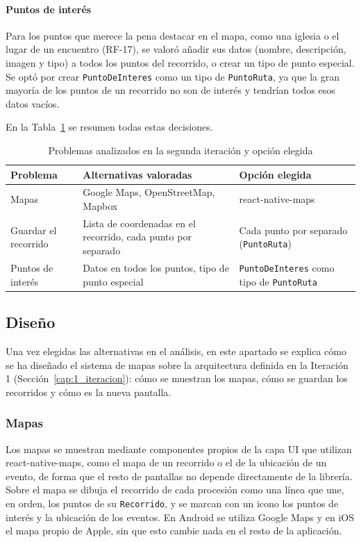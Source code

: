 \paragraph{Puntos de interés}
Para los puntos que merece la pena destacar en el mapa, como una iglesia o el lugar de un encuentro (RF-17), se valoró añadir sus datos (nombre, descripción, imagen y tipo) a todos los puntos del recorrido, o crear un tipo de punto especial. Se optó por crear \texttt{PuntoDeInteres} como un tipo de \texttt{PuntoRuta}, ya que la gran mayoría de los puntos de un recorrido no son de interés y tendrían todos esos datos vacíos.

En la Tabla~\ref{tab:alternativasIt2} se resumen todas estas decisiones.

\begin{table}[H]
\centering
\small
\begin{tabular}{|p{3.6cm}|p{5.6cm}|p{4.4cm}|}
\hline
\textbf{Problema} & \textbf{Alternativas valoradas} & \textbf{Opción elegida} \\
\hline
Mapas & Google Maps, OpenStreetMap, Mapbox & react-native-maps \\
\hline
Guardar el recorrido & Lista de coordenadas en el recorrido, cada punto por separado & Cada punto por separado (\texttt{PuntoRuta}) \\
\hline
Puntos de interés & Datos en todos los puntos, tipo de punto especial & \texttt{PuntoDeInteres} como tipo de \texttt{PuntoRuta} \\
\hline
\end{tabular}
\caption{Problemas analizados en la segunda iteración y opción elegida}
\label{tab:alternativasIt2}
\end{table}

\subsection{Diseño}

Una vez elegidas las alternativas en el análisis, en este apartado se explica cómo se ha diseñado el sistema de mapas sobre la arquitectura definida en la Iteración 1 (Sección~\ref{cap:1_iteracion}): cómo se muestran los mapas, cómo se guardan los recorridos y cómo es la nueva pantalla.

\subsubsection{Mapas}

Los mapas se muestran mediante componentes propios de la capa UI que utilizan react-native-maps, como el mapa de un recorrido o el de la ubicación de un evento, de forma que el resto de pantallas no depende directamente de la librería. Sobre el mapa se dibuja el recorrido de cada procesión como una línea que une, en orden, los puntos de su \texttt{Recorrido}, y se marcan con un icono los puntos de interés y la ubicación de los eventos. En Android se utiliza Google Maps y en iOS el mapa propio de Apple, sin que esto cambie nada en el resto de la aplicación.

